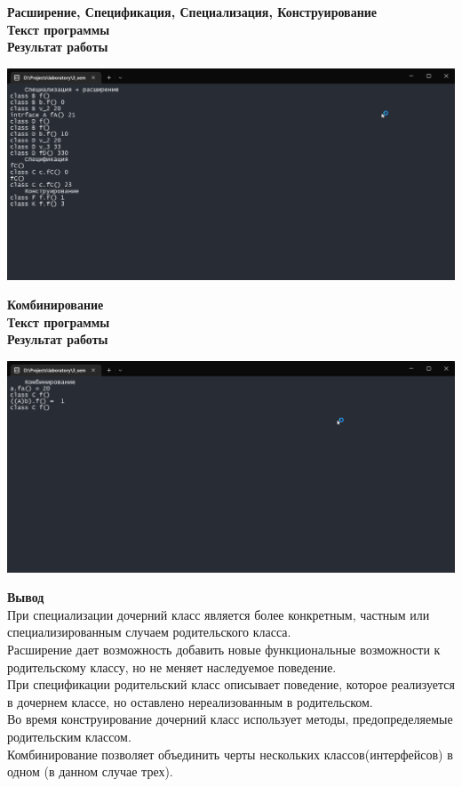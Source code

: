 \documentclass[12pt]{report}
\begin{document}
    \textbf{\large{Расширение, Спецификация, Специализация, Конструирование}}\\
    \textbf{Текст программы}\\
    
    \vspace{0.4in}
    \newpage
    \textbf{Результат работы}\\
    \begin{center}
        \includegraphics[scale=0.5]{formal/lab_4_1.png}\\
    \end{center}

    \newpage
    \textbf{\large{Комбинирование}}\\
    \textbf{Текст программы}\\
    
    \vspace{0.4in}
    \textbf{Результат работы}\\
    \begin{center}
        \includegraphics[scale=0.5]{formal/lab_4_2.png}\\
    \end{center}
    \textbf{Вывод}\\
    При специализации дочерний класс является более конкретным, частным или специализированным случаем родительского класса.\\
    Расширение дает возможность добавить новые функциональные возможности к родительскому классу, но не меняет наследуемое поведение.\\
    При спецификации родительский класс описывает поведение, которое реализуется в дочернем классе, но оставлено нереализованным в родительском.\\
    Во время конструирование дочерний класс использует методы, предопределяемые родительским классом.\\
    Комбинирование позволяет объединить черты нескольких классов(интерфейсов) в одном (в данном случае трех).\\
\end{document}
